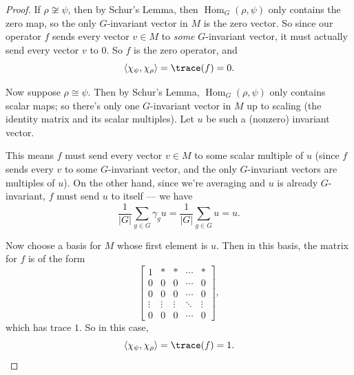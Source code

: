 \begin{proof}
    If $\rho \not\cong \psi$, then by Schur's Lemma, then $\operatorname{Hom}_G(\rho, \psi)$ only contains the zero map, so the only $G$-invariant vector in $M$ is the zero vector. So since our operator $f$ sends every vector $v \in M$ to \emph{some} $G$-invariant vector, it must actually send every vector $v$ to $0$. So $f$ is the zero operator, and \[\langle \chi_\psi, \chi_\rho \rangle = \trace(f) = 0.\] 
    
    Now suppose $\rho \cong \psi$. Then by Schur's Lemma, $\operatorname{Hom}_G(\rho, \psi)$ only contains scalar maps; so there's only one $G$-invariant vector in $M$ up to scaling (the identity matrix and its scalar multiples). Let $u$ be such a (nonzero) invariant vector. 
    
    This means $f$ must send every vector $v \in M$ to some scalar multiple of $u$ (since $f$ sends every $v$ to some $G$-invariant vector, and the only $G$-invariant vectors are multiples of $u$). On the other hand, since we're averaging and $u$ is already $G$-invariant, $f$ must send $u$ to itself --- we have \[\frac{1}{\lvert G \rvert} \sum_{g \in G} \gamma_g u = \frac{1}{\lvert G \rvert} \sum_{g \in G} u = u.\] 
    
    Now choose a basis for $M$ whose first element is $u$. Then in this basis, the matrix for $f$ is of the form \[\begin{bmatrix} 1 & * & * & \cdots & * \\ 0 & 0 & 0 & \cdots & 0 \\ 0 & 0 & 0 & \cdots & 0 \\ \vdots & \vdots & \vdots & \ddots & \vdots \\ 0 & 0 & 0 & \cdots & 0 \end{bmatrix},\] which has trace $1$. So in this case, \[\langle \chi_\psi, \chi_\rho \rangle = \trace(f) = 1. \qedhere\] 
\end{proof}








